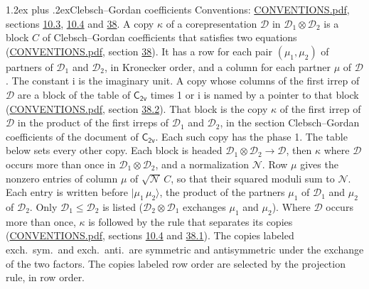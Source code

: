 \documentclass[10pt,a4paper]{article}
\makeatletter
\renewcommand\section{\@startsection{section}{1}{\z@}{-3ex plus -1ex minus -.2ex}%
  {1.2ex plus .2ex}{\normalfont\large\sffamily\bfseries\color{parttitle}}}
\numberwithin{equation}{section}
\newcommand{\grp}[1]{\mathsf{#1}}
\newcommand{\iunit}{\mathrm{i}}
\newcommand{\irrprod}{\otimes}
\newcommand{\mult}{\kappa}
\newcommand{\intx}{\mu}
\newcommand{\cgnorm}{\mathcal{N}}
\newcommand{\prodket}[2]{\lvert {#1}\,{#2}\rangle}
\makeatother
\begin{document}
\section{Clebsch--Gordan coefficients}\label{s:clebsch_gordan}
Conventions: \href{../../CONVENTIONS.pdf}{CONVENTIONS.pdf}, sections \href{../../../rotation/CONVENTIONS.pdf\#conv.10.3}{10.3}, \href{../../../rotation/CONVENTIONS.pdf\#conv.10.4}{10.4} and \href{../../CONVENTIONS.pdf\#conv.38}{38}.
\leavevmode\label{n:index.copy}\label{n:matrix.cg.stored}A copy $\mult$ of a corepresentation $\mathcal{D}$ in $\mathcal{D}_1\irrprod\mathcal{D}_2$ is a block $C$ of Clebsch--Gordan coefficients that satisfies two equations (\href{../../CONVENTIONS.pdf}{CONVENTIONS.pdf}, section \href{../../CONVENTIONS.pdf\#conv.38}{38}). \label{n:index.cg}It has a row for each pair $(\intx_1, \intx_2)$ of partners of $\mathcal{D}_1$ and $\mathcal{D}_2$, in Kronecker order, and a column for each partner $\intx$ of $\mathcal{D}$.
The constant $\iunit$ is the imaginary unit.
A copy whose columns of the first irrep of $\mathcal{D}$ are a block of the table of $\grp{C_{2v}}$ times 1 or $\iunit$ is named by a pointer to that block (\href{../../CONVENTIONS.pdf}{CONVENTIONS.pdf}, section \href{../../CONVENTIONS.pdf\#conv.38.2}{38.2}). That block is the copy $\mult$ of the first irrep of $\mathcal{D}$ in the product of the first irreps of $\mathcal{D}_1$ and $\mathcal{D}_2$, in the section Clebsch--Gordan coefficients of the document of \href{../../../rotation/data/pdf/C2v.pdf}{$\grp{C_{2v}}$}. Each such copy has the phase 1. The table below sets every other copy.
Each block is headed $\mathcal{D}_1\irrprod\mathcal{D}_2\to\mathcal{D}$, then $\mult$ where $\mathcal{D}$ occurs more than once in $\mathcal{D}_1\irrprod\mathcal{D}_2$, and a normalization $\cgnorm$. Row $\intx$ gives the nonzero entries of column $\intx$ of $\sqrt{\cgnorm}\,C$, so that their squared moduli sum to $\cgnorm$. \label{n:vector.ket.product}Each entry is written before $\prodket{\intx_1}{\intx_2}$, the product of the partners $\intx_1$ of $\mathcal{D}_1$ and $\intx_2$ of $\mathcal{D}_2$. Only $\mathcal{D}_1 \le \mathcal{D}_2$ is listed ($\mathcal{D}_2\irrprod\mathcal{D}_1$ exchanges $\intx_1$ and $\intx_2$).
Where $\mathcal{D}$ occurs more than once, $\mult$ is followed by the rule that separates its copies (\href{../../CONVENTIONS.pdf}{CONVENTIONS.pdf}, sections \href{../../../rotation/CONVENTIONS.pdf\#conv.10.4}{10.4} and \href{../../CONVENTIONS.pdf\#conv.38.1}{38.1}). \label{n:abbreviation.exchange}The copies labeled exch.\ sym.\ and exch.\ anti.\ are symmetric and antisymmetric under the exchange of the two factors. The copies labeled row order are selected by the projection rule, in row order.
\end{document}
